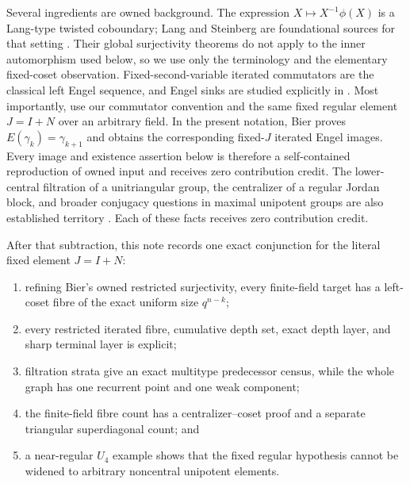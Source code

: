 \documentclass[10pt,a4paper]{amsart}
\theoremstyle{definition}
\theoremstyle{remark}
\begin{document}
Several ingredients are owned background.  The expression
$X\mapsto X^{-1}\phi(X)$ is a Lang-type twisted coboundary; Lang and
Steinberg are foundational sources for that setting
\cite{Lang1956,Steinberg1968}.  Their global surjectivity theorems do not
apply to the inner automorphism used below, so we use only the terminology
and the elementary fixed-coset observation.  Fixed-second-variable iterated
commutators are the classical left Engel sequence, and Engel sinks are
studied explicitly in \cite{AcciarriShumyatsky2019,KhukhroShumyatsky2026}.
Most importantly, \citet[Lemma~1 and the proof of Theorem~1]{Bier2013} use our commutator
convention and the same fixed regular element $J=I+N$ over an arbitrary
field.  In the present notation, Bier proves
$E(\gamma_k)=\gamma_{k+1}$ and obtains the corresponding fixed-$J$ iterated
Engel images.  Every image and existence assertion below is therefore a
self-contained reproduction of owned input and receives zero contribution
credit.
The lower-central filtration of a unitriangular group, the centralizer of a
regular Jordan block, and broader conjugacy questions in maximal unipotent
groups are also established territory \cite{Steinberg1968,Goodwin2006}.
Each of these facts receives zero contribution credit.

After that subtraction, this note records one exact conjunction for the
literal fixed element $J=I+N$:
\begin{enumerate}
\item refining Bier's owned restricted surjectivity, every finite-field
      target has a left-coset fibre of the exact uniform size $q^{n-k}$;
\item every restricted iterated fibre, cumulative depth set, exact depth
      layer, and sharp terminal layer is explicit;
\item filtration strata give an exact multitype predecessor census, while
      the whole graph has one recurrent point and one weak component;
\item the finite-field fibre count has a centralizer--coset proof and a
      separate triangular superdiagonal count; and
\item a near-regular $U_4$ example shows that the fixed regular hypothesis
      cannot be widened to arbitrary noncentral unipotent elements.
\end{enumerate}
\end{document}
